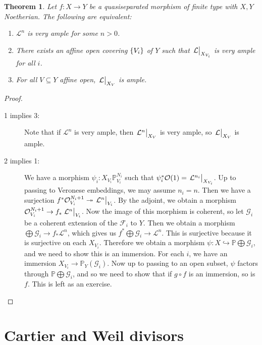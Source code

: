\documentclass[leqno, openany]{memoir}
\newtheorem{thm}{Theorem}[section]
\theoremstyle{definition}
\theoremstyle{remark}
\theoremstyle{plain}
\theoremstyle{definition}
\theoremstyle{remark}
\renewcommand{\P}{\mathbb{P}}
\newcommand{\mc}[1]{\mathcal{#1}}
\begin{document}
\begin{thm}
    Let $f \colon X \to Y$ be a quasiseparated morphism of finite type with $X, Y$ Noetherian. The following are equivalent:
    \begin{enumerate}
        \item $\mc{L}^n$ is very ample for some $n > 0$.
        \item There exists an affine open covering $\qty{V_i}$ of $Y$ such that $\eval{\mc{L}}_{X_{V_i}}$ is very ample for all $i$.
        \item For all $V \subseteq Y$ affine open, $\eval{\mc{L}}_{X_V}$ is ample.
    \end{enumerate}
\end{thm}

\begin{proof}\leavevmode
    \begin{description}
        \item[1 implies 3:] Note that if $\mc{L}^n$ is very ample, then $\eval{\mc{L}^n}_{X_V}$ is very ample, so $\eval{\mc{L}}_{X_V}$ is ample.
        \item[2 implies 1:] We have a morphism $\psi_i \colon X_{V_i} \P^{N_i}_{V_i}$ such that $\psi_i^* \mc{O}(1) = \eval{\mc{L}^{n_i}}_{X_{V_i}}$. Up to passing to Veronese embeddings, we may assume $n_i = n$. Then we have a surjection $f^* \mc{O}_{V_i}^{N_i+1} \twoheadrightarrow \eval{\mc{L}^n}_{V_i}$. By the adjoint, we obtain a morphism $\mc{O}_{V_i}^{N_i+1} \to f_* \eval{\mc{L}^n}_{V_i}$. Now the image of this morphism is coherent, so let $\mc{G}_i$ be a coherent extension of the $\mc{F}_i$ to $Y$. Then we obtain a morphism $\bigoplus \mc{G}_i \to f_* \mc{L}^n$, which gives us $f^* \bigoplus \mc{G}_i \to \mc{L}^n$. This is surjective because it is surjective on each $X_{V_i}$. Therefore we obtain a morphism $\psi \colon X \hookrightarrow \P \bigoplus \mc{G}_i$, and we need to show this is an immersion. For each $i$, we have an immersion $X_{V_i} \to \P_{Y}(\mc{G}_i)$. Now up to passing to an open subset, $\psi$ factors through $\P \bigoplus \mc{G}_i$, and so we need to show that if $g \circ f$ is an immersion, so is $f$. This is left as an exercise. \qedhere
    \end{description}
\end{proof}

\section{Cartier and Weil divisors}%
\label{sec:cartier_and_weil_divisors}
\end{document}
